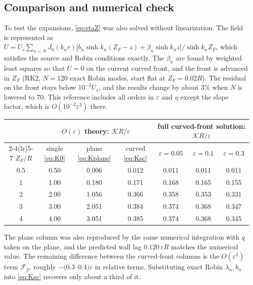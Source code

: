 \documentclass[11pt]{article}
\numberwithin{equation}{section}
\begin{document}
\subsection{Comparison and numerical check}
To test the expansions, \eqref{eq:etaZ} was also solved without linearization. The field is represented as $U=U_s\sum_{n<N}J_0(k_nr)\bigl[b_n\sinh k_n(Z_F-z)+\beta_n\sinh k_nz\bigr]/\sinh k_nZ_F$, which satisfies the source and Robin conditions exactly. The $\beta_n$ are found by weighted least squares so that $U=0$ on the current curved front, and the front is advanced in $Z_F$ (RK2, $N=120$ exact Robin modes, start flat at $Z_F=0.02R$). The residual on the front stays below $10^{-3}U_s$, and the results change by about $3\%$ when $N$ is lowered to $70$. This reference includes all orders in $\varepsilon$ and $\eta$ except the slope factor, which is $O(10^{-2}\varepsilon^2)$ there.
\begin{center}
\begin{tabular}{@{}ccccccc@{}}
\toprule
& \multicolumn{3}{c}{$O(\varepsilon)$ theory: $\mathcal K R/\varepsilon$} & \multicolumn{3}{c}{full curved-front solution: $\mathcal KR/\varepsilon$}\\
\cmidrule(lr){2-4}\cmidrule(lr){5-7}
$Z_F/R$ & single \eqref{eq:K0} & plane \eqref{eq:Kplane} & curved \eqref{eq:Ksc} & $\varepsilon=0.05$ & $\varepsilon=0.1$ & $\varepsilon=0.3$\\
\midrule
0.5 & 0.50 & 0.006 & 0.012 & 0.011 & 0.011 & 0.011\\
1   & 1.00 & 0.180 & 0.171 & 0.168 & 0.165 & 0.155\\
2   & 2.00 & 1.056 & 0.366 & 0.358 & 0.353 & 0.331\\
3   & 3.00 & 2.051 & 0.384 & 0.374 & 0.368 & 0.347\\
4   & 4.00 & 3.051 & 0.385 & 0.374 & 0.368 & 0.345\\
\bottomrule
\end{tabular}
\end{center}
The plane column was also reproduced by the same numerical integration with $q$ taken on the plane, and the predicted wall lag $0.120\,\varepsilon R$ matches the numerical value. The remaining difference between the curved-front columns is the $O(\varepsilon^2)$ term $\mathcal F_2$, roughly $-(0.3$--$0.4)\varepsilon$ in relative terms. Substituting exact Robin $\lambda_n,b_n$ into \eqref{eq:Ksc} recovers only about a third of it.
\end{document}
